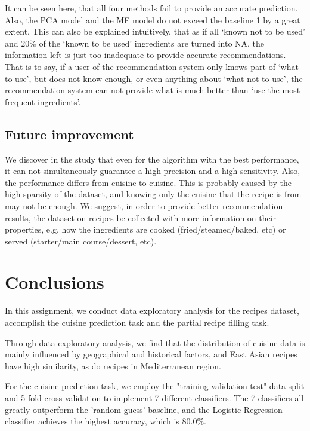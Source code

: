 \documentclass{article}
\begin{document}
It can be seen here, that all four methods fail to provide an accurate prediction. Also, the PCA model and the MF model do not exceed the baseline 1 by a great extent. This can also be explained intuitively, that as if all ‘known not to be used’ and 20\% of the ‘known to be used’ ingredients are turned into NA, the information left is just too inadequate to provide accurate recommendations. That is to say, if a user of the recommendation system only knows part of ‘what to use’, but does not know enough, or even anything about ‘what not to use’, the recommendation system can not provide what is much better than ‘use the most frequent ingredients’.

\subsection{Future improvement}
We discover in the study that even for the algorithm with the best performance, it can not simultaneously guarantee a high precision and a high sensitivity. Also, the performance differs from cuisine to cuisine. This is probably caused by the high sparsity of the dataset, and knowing only the cuisine that the recipe is from may not be enough. We suggest, in order to provide better recommendation results, the dataset on recipes be collected with more information on their properties, e.g. how the ingredients are cooked (fried/steamed/baked, etc) or served (starter/main course/dessert, etc). 

\section{Conclusions} 

In this assignment, we conduct data exploratory analysis for the recipes dataset, accomplish the cuisine prediction task and the  partial recipe filling task.

Through data exploratory analysis, we find that the distribution of cuisine data is mainly influenced by geographical and historical factors, and East Asian recipes have high similarity, as do recipes in Mediterranean region.

For the cuisine prediction task, we employ the "training-validation-test" data split and 5-fold cross-validation to implement 7 different classifiers. The 7 classifiers all greatly outperform the ’random guess’ baseline, and the Logistic Regression classifier achieves the highest accuracy, which is 80.0\%.
\end{document}
